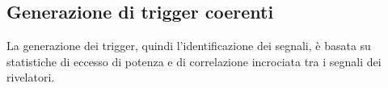 %
%
\subsection{Generazione di trigger coerenti}
\label{section:coherent_trigger}
La generazione dei trigger, quindi l'identificazione dei segnali, è basata su statistiche di eccesso di potenza e di correlazione incrociata tra i segnali dei rivelatori. 

